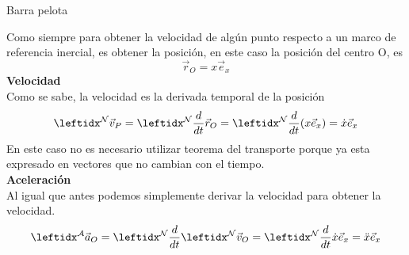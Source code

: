 \begin{solucion}{Barra pelota}
\begin{center}
\end{center}

Como siempre para obtener la velocidad de algún punto respecto a un marco de referencia inercial, es obtener la posición, en este caso la posición del centro O, es 
$$\vec{r}_O=x\vec{e}_x$$
\textbf{Velocidad}\\
Como se sabe, la velocidad es la derivada temporal de la posición
$$\marc{\vec{v}_P}{N}=\der{\vec{r}_{O}}{N}=\der{(x\vec{e}_x)}{N}=\dot x\vec{e}_x$$
En este caso no es necesario utilizar teorema del transporte porque ya esta expresado en vectores que no cambian con el tiempo.\\
\textbf{Aceleración}\\
Al igual que antes podemos simplemente derivar la velocidad para obtener la velocidad.
$$\marc{\vec{a}_O}{A}=\der{\marc{}{N}\vec{v}_O}{N}=\der{\dot x\vec{e}_x}{N}=\ddot{x}\vec{e}_x$$


\end{solucion}
